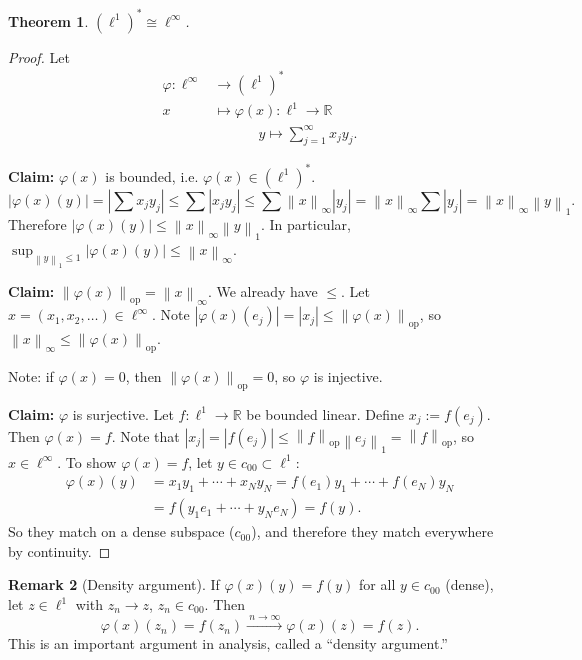 \documentclass[12pt]{article}
\newcommand{\abs}[1]{\left| #1 \right|}
\newcommand{\norm}[1]{\left\| #1 \right\|}
\newcommand{\R}{\mathbb{R}}
\newtheorem{thm}{Theorem}[section]
\theoremstyle{definition}
\newtheorem{rmk}[thm]{Remark}
\begin{document}
\begin{thm}
	$(\ell^1)^* \cong \ell^\infty$.
\end{thm}
\begin{proof}
	Let
	\begin{align*}
		\varphi : \ell^\infty &\to (\ell^1)^* \\
		x &\mapsto \varphi(x) : \ell^1 \to \R \\
		&\qquad\quad\ y \mapsto \sum_{j=1}^\infty x_j y_j.
	\end{align*}

	\textbf{Claim: } $\varphi(x)$ is bounded, i.e. $\varphi(x) \in (\ell^1)^*$.
	\begin{equation*}
		\abs{\varphi(x)(y)} = \abs{\sum x_j y_j} \leq \sum \abs{x_j y_j} \leq \sum \norm{x}_\infty \abs{y_j} = \norm{x}_\infty \sum \abs{y_j} = \norm{x}_\infty \norm{y}_1.
	\end{equation*}
	Therefore $\abs{\varphi(x)(y)} \leq \norm{x}_\infty \norm{y}_1$.
	In particular, $\sup_{\norm{y}_1 \leq 1} \abs{\varphi(x)(y)} \leq \norm{x}_\infty$.

	\textbf{Claim: } $\norm{\varphi(x)}_{\mathrm{op}} = \norm{x}_\infty$.
	We already have $\leq$.
	Let $x = (x_1, x_2, \dots) \in \ell^\infty$.
	Note $\abs{\varphi(x)(e_j)} = \abs{x_j} \leq \norm{\varphi(x)}_{\mathrm{op}}$, so $\norm{x}_\infty \leq \norm{\varphi(x)}_{\mathrm{op}}$.

	Note: if $\varphi(x) = 0$, then $\norm{\varphi(x)}_{\mathrm{op}} = 0$, so $\varphi$ is injective.

	\textbf{Claim: } $\varphi$ is surjective.
	Let $f : \ell^1 \to \R$ be bounded linear.
	Define $x_j := f(e_j)$.
	Then $\varphi(x) = f$.
	Note that $\abs{x_j} = \abs{f(e_j)} \leq \norm{f}_{\mathrm{op}} \norm{e_j}_1 = \norm{f}_{\mathrm{op}}$, so $x \in \ell^\infty$.
	To show $\varphi(x) = f$, let $y \in c_{00} \subset \ell^1$:
	\begin{align*}
		\varphi(x)(y) &= x_1 y_1 + \cdots + x_N y_N = f(e_1) y_1 + \cdots + f(e_N) y_N \\
		&= f(y_1 e_1 + \cdots + y_N e_N) = f(y).
	\end{align*}
	So they match on a dense subspace ($c_{00}$), and therefore they match everywhere by continuity.
\end{proof}

\begin{rmk}[Density argument]
	If $\varphi(x)(y) = f(y)$ for all $y \in c_{00}$ (dense), let $z \in \ell^1$ with $z_n \to z$, $z_n \in c_{00}$.
	Then
	\begin{equation*}
		\varphi(x)(z_n) = f(z_n) \xrightarrow{\ n \to \infty\ } \varphi(x)(z) = f(z).
	\end{equation*}
	This is an important argument in analysis, called a ``density argument.''
\end{rmk}
\end{document}
